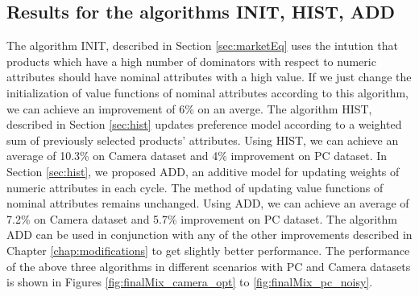 \subsection{Results for the algorithms INIT, HIST, ADD}
The algorithm INIT, described in Section \ref{sec:marketEq} uses the intution that products which have a high number of dominators with respect to numeric attributes should have nominal attributes with a high value.
If we just change the initialization of value functions of nominal attributes according to this algorithm, we can achieve an improvement of 6\% on an averge.
The algorithm HIST, described in Section \ref{sec:hist} updates preference model according to a weighted sum of previously selected products' attributes.
Using HIST, we can achieve an average of 10.3\% on Camera dataset and 4\% improvement on PC dataset.
In Section \ref{sec:hist}, we proposed ADD, an additive model for  updating weights of numeric attributes in each cycle.
The method of updating value functions of nominal attributes remains unchanged.
Using ADD, we can achieve an average of 7.2\% on Camera dataset and 5.7\% improvement on PC dataset.
The algorithm ADD can be used in conjunction with any of the other improvements described in Chapter \ref{chap:modifications} to get slightly better performance.
The performance of the above three algorithms in different scenarios with PC and Camera datasets is shown in Figures \ref{fig:finalMix_camera_opt} to \ref{fig:finalMix_pc_noisy}.

